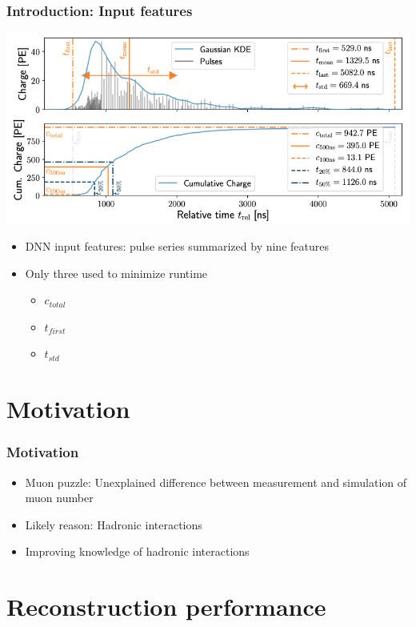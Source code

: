 \documentclass[aspectratio=1610, 9pt]{beamer}
\begin{document}
\begin{frame}
  \frametitle{Introduction: Input features}
  \includegraphics[scale=0.35]{Plots/Data input}
  \begin{itemize}
    \item DNN input features: pulse series summarized by nine features \cite{Abbasi_2021}
    \item Only three used to minimize runtime
    \begin{itemize}
      \item $c_{total}$
      \item $t_{first}$
      \item $t_{std}$
    \end{itemize}
  \end{itemize}
\end{frame}
\section{Motivation}
\begin{frame}
  \frametitle{Motivation}
  \begin{itemize}
    \item Muon puzzle: Unexplained difference between measurement and simulation of muon number
    \item Likely reason: Hadronic interactions
    \item Improving knowledge of hadronic interactions
  \end{itemize}
\end{frame}
\section{Reconstruction performance}
\end{document}
